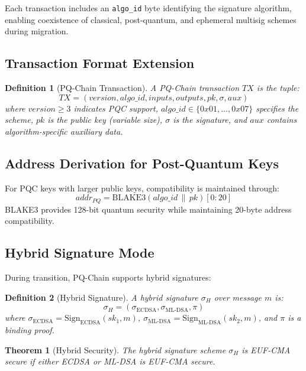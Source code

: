\documentclass[12pt, a4paper, twocolumn]{article}
\newtheorem{definition}{Definition}
\newtheorem{theorem}{Theorem}
\begin{document}
Each transaction includes an \texttt{algo\_id} byte identifying the signature algorithm, enabling coexistence of classical, post-quantum, and ephemeral multisig schemes during migration.

\subsection{Transaction Format Extension}

\begin{definition}[PQ-Chain Transaction]
A PQ-Chain transaction $\mathit{TX}$ is the tuple:
\[
\mathit{TX} = (\mathit{version}, \mathit{algo\_id}, \mathit{inputs}, \mathit{outputs}, \mathit{pk}, \sigma, \mathit{aux})
\]
where $\mathit{version} \geq 3$ indicates PQC support, $\mathit{algo\_id} \in \{0x01, \ldots, 0x07\}$ specifies the scheme, $\mathit{pk}$ is the public key (variable size), $\sigma$ is the signature, and $\mathit{aux}$ contains algorithm-specific auxiliary data.
\end{definition}

\subsection{Address Derivation for Post-Quantum Keys}

For PQC keys with larger public keys, compatibility is maintained through:
\[
\mathit{addr}_{PQ} = \text{BLAKE3}(\mathit{algo\_id} \,\|\, \mathit{pk})[0:20]
\]
BLAKE3 provides 128-bit quantum security while maintaining 20-byte address compatibility.

\subsection{Hybrid Signature Mode}

During transition, PQ-Chain supports hybrid signatures:

\begin{definition}[Hybrid Signature]
A hybrid signature $\sigma_H$ over message $m$ is:
\[
\sigma_H = (\sigma_{\text{ECDSA}}, \sigma_{\text{ML-DSA}}, \pi)
\]
where $\sigma_{\text{ECDSA}} = \text{Sign}_{\text{ECDSA}}(sk_1, m)$, $\sigma_{\text{ML-DSA}} = \text{Sign}_{\text{ML-DSA}}(sk_2, m)$, and $\pi$ is a binding proof.
\end{definition}

\begin{theorem}[Hybrid Security]
The hybrid signature scheme $\sigma_H$ is EUF-CMA secure if \emph{either} ECDSA or ML-DSA is EUF-CMA secure.
\end{theorem}
\end{document}
